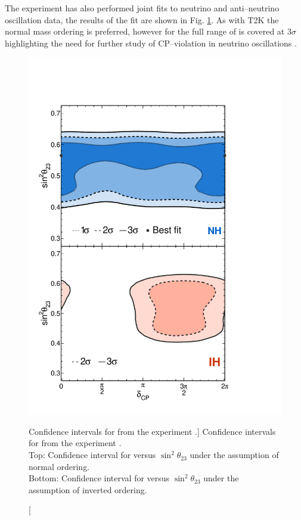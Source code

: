 The \nova{} experiment has also performed joint fits to neutrino and
anti--neutrino oscillation data, the results of the fit are shown in Fig.
\ref{fig:nova_cp}. As with T2K the normal mass ordering is preferred, however
for \nova{} the full range of \dcp{} is covered at $3\sigma$ highlighting the 
need for further study of CP--violation in neutrino oscillations
\cite{PhysRevLett.123.151803}.

\begin{figure}
	\centering
	\includegraphics[height=0.7\textheight]{figures/nova_dcp.pdf}
	\caption
	[Confidence intervals for \dcp{} from the \nova{} experiment 
	\cite{PhysRevLett.123.151803}.]
	{Confidence intervals for \dcp{} from the \nova{} experiment 
	\cite{PhysRevLett.123.151803}. \\
	Top: Confidence interval for \dcp{} versus $\sin^2\theta_{23}$ under the
	assumption of normal ordering.\\
	Bottom: Confidence interval for \dcp{} versus $\sin^2\theta_{23}$ under the
	assumption of inverted ordering.\\
	}
	\label{fig:nova_cp}
\end{figure}

